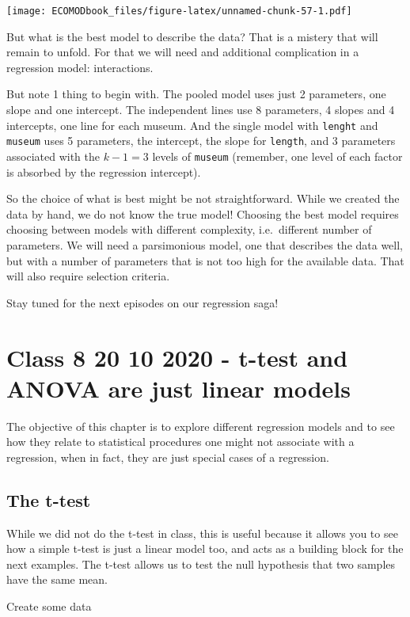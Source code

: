 \documentclass[
]{book}
\begin{document}
\texttt{[image: ECOMODbook\_files/figure-latex/unnamed-chunk-57-1.pdf]}

But what is the best model to describe the data? That is a mistery that will remain to unfold. For that we will need and additional complication in a regression model: interactions.

But note 1 thing to begin with. The pooled model uses just 2 parameters, one slope and one intercept. The independent lines use 8 parameters, 4 slopes and 4 intercepts, one line for each museum. And the single model with \texttt{lenght} and \texttt{museum} uses 5 parameters, the intercept, the slope for \texttt{length}, and 3 parameters associated with the \(k-1=3\) levels of \texttt{museum} (remember, one level of each factor is absorbed by the regression intercept).

So the choice of what is best might be not straightforward. While we created the data by hand, we do not know the true model! Choosing the best model requires choosing between models with different complexity, i.e.~different number of parameters. We will need a parsimonious model, one that describes the data well, but with a number of parameters that is not too high for the available data. That will also require selection criteria.

Stay tuned for the next episodes on our regression saga!

\hypertarget{aula8}{%
\chapter{Class 8 20 10 2020 - t-test and ANOVA are just linear models}\label{aula8}}

The objective of this chapter is to explore different regression models and to see how they relate to statistical procedures one might not associate with a regression, when in fact, they are just special cases of a regression.

\hypertarget{the-t-test}{%
\section{The t-test}\label{the-t-test}}

While we did not do the t-test in class, this is useful because it allows you to see how a simple t-test is just a linear model too, and acts as a building block for the next examples. The t-test allows us to test the null hypothesis that two samples have the same mean.

Create some data
\end{document}
